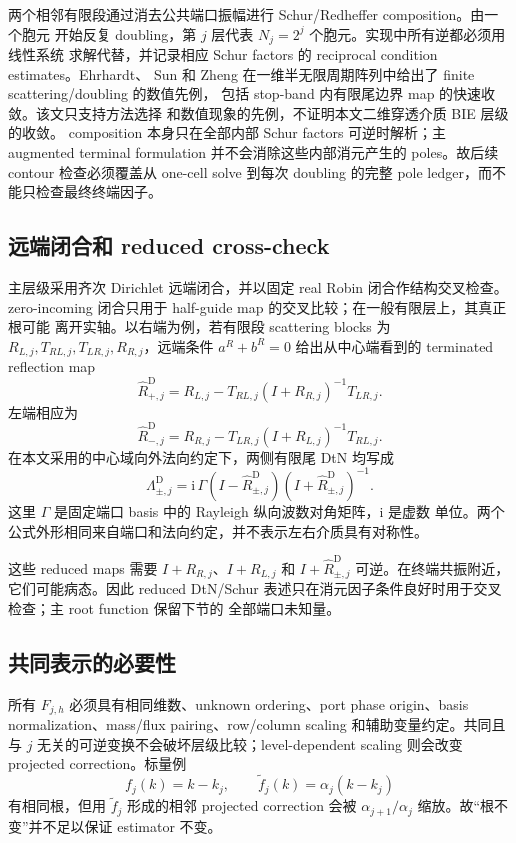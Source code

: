 \documentclass[UTF8,fontset=fandol,11pt,a4paper]{ctexart}
\begin{document}
两个相邻有限段通过消去公共端口振幅进行 Schur/Redheffer composition。由一个胞元
开始反复 doubling，第 $j$ 层代表 $N_j=2^j$ 个胞元。实现中所有逆都必须用线性系统
求解代替，并记录相应 Schur factors 的 reciprocal condition estimates。Ehrhardt、
Sun 和 Zheng 在一维半无限周期阵列中给出了 finite scattering/doubling 的数值先例，
包括 stop-band 内有限尾边界 map 的快速收敛\cite{Ehrhardt2009}。该文只支持方法选择
和数值现象的先例，不证明本文二维穿透介质 BIE 层级的收敛。
composition 本身只在全部内部 Schur factors 可逆时解析；主 augmented terminal
formulation 并不会消除这些内部消元产生的 poles。故后续 contour 检查必须覆盖从
one-cell solve 到每次 doubling 的完整 pole ledger，而不能只检查最终终端因子。

\subsection{远端闭合和 reduced cross-check}

主层级采用齐次 Dirichlet 远端闭合，并以固定 real Robin 闭合作结构交叉检查。
zero-incoming 闭合只用于 half-guide map 的交叉比较；在一般有限层上，其真正根可能
离开实轴。以右端为例，若有限段 scattering blocks 为
$R_{L,j},T_{RL,j},T_{LR,j},R_{R,j}$，远端条件 $a^R+b^R=0$ 给出从中心端看到的
terminated reflection map
\[
  \widehat R_{+,j}^{\mathrm D}
  =R_{L,j}-T_{RL,j}(I+R_{R,j})^{-1}T_{LR,j}.
\]
左端相应为
\[
  \widehat R_{-,j}^{\mathrm D}
  =R_{R,j}-T_{LR,j}(I+R_{L,j})^{-1}T_{RL,j}.
\]
在本文采用的中心域向外法向约定下，两侧有限尾 DtN 均写成
\[
  \Lambda_{\pm,j}^{\mathrm D}
  =\mathrm{i}\,\Gamma(I-\widehat R_{\pm,j}^{\mathrm D})
   (I+\widehat R_{\pm,j}^{\mathrm D})^{-1}.
\]
这里 $\Gamma$ 是固定端口 basis 中的 Rayleigh 纵向波数对角矩阵，$\mathrm{i}$ 是虚数
单位。两个公式外形相同来自端口和法向约定，并不表示左右介质具有对称性。

这些 reduced maps 需要 $I+R_{R,j}$、$I+R_{L,j}$ 和
$I+\widehat R_{\pm,j}^{\mathrm D}$ 可逆。在终端共振附近，它们可能病态。因此 reduced
DtN/Schur 表述只在消元因子条件良好时用于交叉检查；主 root function 保留下节的
全部端口未知量。

\subsection{共同表示的必要性}

所有 $F_{j,h}$ 必须具有相同维数、unknown ordering、port phase origin、basis
normalization、mass/flux pairing、row/column scaling 和辅助变量约定。共同且与
$j$ 无关的可逆变换不会破坏层级比较；level-dependent scaling 则会改变 projected
correction。标量例
\[
  f_j(k)=k-k_j,
  \qquad
  \widetilde f_j(k)=\alpha_j(k-k_j)
\]
有相同根，但用 $\widetilde f_j$ 形成的相邻 projected correction 会被
$\alpha_{j+1}/\alpha_j$ 缩放。故“根不变”并不足以保证 estimator 不变。
\end{document}
